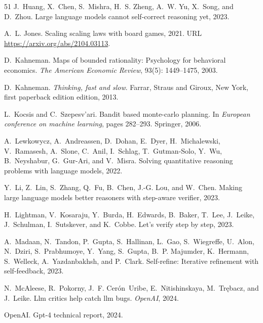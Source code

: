 \begin{thebibliography}{51}
J.~Huang, X.~Chen, S.~Mishra, H.~S. Zheng, A.~W. Yu, X.~Song, and D.~Zhou.
\newblock Large language models cannot self-correct reasoning yet, 2023.

A.~L. Jones.
\newblock Scaling scaling laws with board games, 2021.
\newblock URL \url{https://arxiv.org/abs/2104.03113}.

D.~Kahneman.
\newblock Maps of bounded rationality: Psychology for behavioral economics.
\newblock \emph{The American Economic Review}, 93(5): 1449--1475, 2003.

D.~Kahneman.
\newblock \emph{Thinking, fast and slow}.
\newblock Farrar, Straus and Giroux, New York, first paperback edition edition, 2013.

L.~Kocsis and C.~Szepesv{'a}ri.
\newblock Bandit based monte-carlo planning.
\newblock In \emph{European conference on machine learning}, pages 282--293. Springer, 2006.

A.~Lewkowycz, A.~Andreassen, D.~Dohan, E.~Dyer, H.~Michalewski, V.~Ramasesh, A.~Slone, C.~Anil, I.~Schlag, T.~Gutman-Solo, Y.~Wu, B.~Neyshabur, G.~Gur-Ari, and V.~Misra.
\newblock Solving quantitative reasoning problems with language models, 2022.

Y.~Li, Z.~Lin, S.~Zhang, Q.~Fu, B.~Chen, J.-G. Lou, and W.~Chen.
\newblock Making large language models better reasoners with step-aware verifier, 2023.

H.~Lightman, V.~Kosaraju, Y.~Burda, H.~Edwards, B.~Baker, T.~Lee, J.~Leike, J.~Schulman, I.~Sutskever, and K.~Cobbe.
\newblock Let's verify step by step, 2023.

A.~Madaan, N.~Tandon, P.~Gupta, S.~Hallinan, L.~Gao, S.~Wiegreffe, U.~Alon, N.~Dziri, S.~Prabhumoye, Y.~Yang, S.~Gupta, B.~P. Majumder, K.~Hermann, S.~Welleck, A.~Yazdanbakhsh, and P.~Clark.
\newblock Self-refine: Iterative refinement with self-feedback, 2023.

N.~McAleese, R.~Pokorny, J.~F. Cerón~Uribe, E.~Nitishinskaya, M.~Trębacz, and J.~Leike.
\newblock Llm critics help catch llm bugs.
\newblock \emph{OpenAI}, 2024.

OpenAI.
\newblock Gpt-4 technical report, 2024.


\end{thebibliography}
